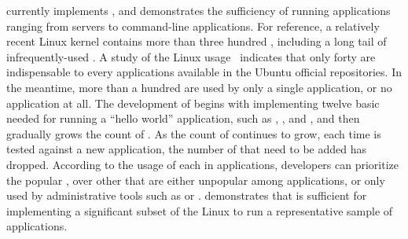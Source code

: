 







\Thelibos{} currently implements \graphenesyscallnum{} \linuxapis{},
and demonstrates 
the sufficiency of running applications ranging from servers to command-line applications.
For reference,
a relatively recent Linux kernel contains more than three hundred \linuxapis{}, including a long tail of infrequently-used \linuxapis{}.
A study of the Linux \linuxapi{} usage~\cite{tsai16apistudy}
indicates that only forty \linuxapis{} are indispensable to every applications available in the Ubuntu official repositories.
In the meantime, more than a hundred \linuxapis{} are used by only a single application,
or no application at all.
The development of \thelibos{} begins with
implementing twelve basic \linuxapis{} needed for running a ``hello world'' application,
such as , , and ,
and then gradually grows the count of \linuxapis{}.
As the count of \linuxapis{} continues to grow,
each time \thelibos{} is tested against a new application, the number of \linuxapis{} that need to be added
has dropped.
According to the usage of each \linuxapi{} in applications,
developers can prioritize the popular \linuxapis{}, over other \linuxapis{} that are either unpopular among applications, or only used by administrative tools such as  or .
\thelibos{} demonstrates that
\thehostabi{} is sufficient for implementing
a significant subset of the Linux \linuxapis{} to run
a representative sample of applications.


